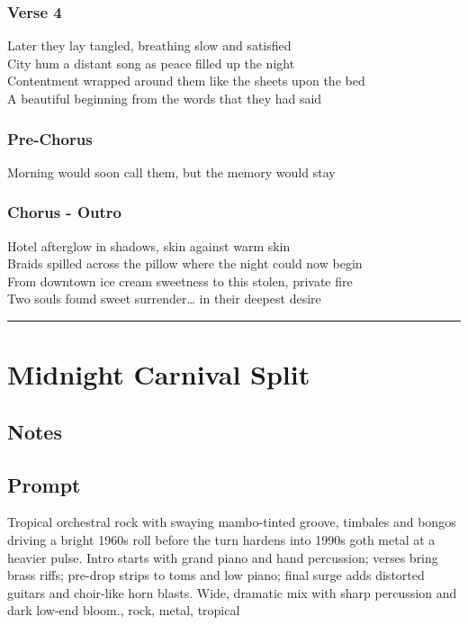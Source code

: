 \subsubsection{Verse 4}\label{verse-4-6}

Later they lay tangled, breathing slow and satisfied\\
City hum a distant song as peace filled up the night\\
Contentment wrapped around them like the sheets upon the bed\\
A beautiful beginning from the words that they had said

\subsubsection{Pre-Chorus}\label{pre-chorus-30}

Morning would soon call them, but the memory would stay

\subsubsection{Chorus - Outro}\label{chorus---outro-2}

Hotel afterglow in shadows, skin against warm skin\\
Braids spilled across the pillow where the night could now begin\\
From downtown ice cream sweetness to this stolen, private fire\\
Two souls found sweet surrender\ldots{} in their deepest desire

\begin{center}\rule{0.5\linewidth}{0.5pt}\end{center}

\section{Midnight Carnival Split}\label{midnight-carnival-split}

\subsection{Notes}\label{notes-42}

\subsection{Prompt}\label{prompt-1}

Tropical orchestral rock with swaying mambo-tinted groove, timbales and
bongos driving a bright 1960s roll before the turn hardens into 1990s
goth metal at a heavier pulse. Intro starts with grand piano and hand
percussion; verses bring brass riffs; pre-drop strips to toms and low
piano; final surge adds distorted guitars and choir-like horn blasts.
Wide, dramatic mix with sharp percussion and dark low-end bloom., rock,
metal, tropical

